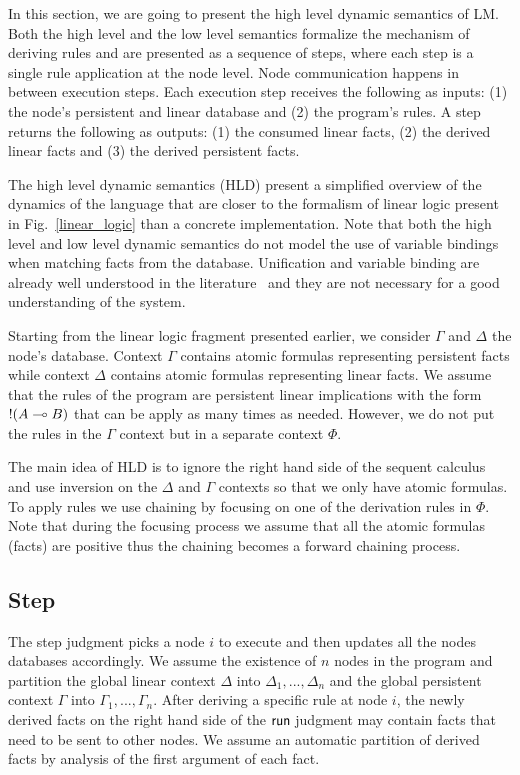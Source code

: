 

In this section, we are going to present the high level dynamic semantics of LM. Both the high level and the low
level semantics formalize the mechanism of deriving rules and are presented as a sequence of steps, where each step
is a single rule application at the node level. Node communication happens in between execution steps.
Each execution step receives the following as inputs: (1) the node's persistent and linear database and (2) the program's rules.
A step returns the following as outputs: (1) the consumed linear facts, (2) the derived linear facts and
(3) the derived persistent facts.

The high level dynamic semantics (HLD) present a simplified overview of the dynamics of the language that are
closer to the formalism of linear logic present in Fig.~\ref{linear_logic} than a concrete implementation.
Note that both the high level and low level dynamic semantics do not model the use of variable bindings when matching
facts from the database. Unification and variable binding are already well understood in the
literature~\cite{Baader:1994:UT:185705.185711} and they are not necessary for a good understanding of the system.

Starting from the linear logic fragment presented earlier, we consider $\Gamma$ and $\Delta$ the node's database.
Context $\Gamma$ contains atomic formulas representing persistent facts while context $\Delta$ contains atomic formulas
representing linear facts.
We assume that the rules of the program are persistent linear implications with the form
${!} (A \multimap B)$ that can be apply as many times as needed. However, we do not put the rules in the $\Gamma$
context but in a separate context $\Phi$.

The main idea of HLD is to ignore the right hand side of the sequent calculus
and use inversion on the $\Delta$ and $\Gamma$ contexts so that we only have atomic formulas.
To apply rules we use chaining by focusing on one of the derivation rules in $\Phi$. Note
that during the focusing process we assume that all the atomic formulas (facts) are positive thus the chaining
becomes a forward chaining process.

\subsection{Step}\label{step_hld}

The step judgment picks a node $i$ to execute and then updates all the nodes databases accordingly. We assume the existence of $n$
nodes in the program and partition the global linear context $\Delta$ into $\Delta_1, ..., \Delta_n$ and the global persistent
context $\Gamma$ into $\Gamma_1, ..., \Gamma_n$. After deriving a specific rule at node $i$, the newly derived facts on the right
hand side of the $\mathsf{run} \;$judgment may contain facts that need to be sent to other nodes. We assume an automatic partition of derived
facts by analysis of the first argument of each fact.

